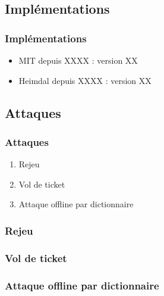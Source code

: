\documentclass[svgnames]{beamer}
\begin{document}
\subsection{Implémentations}

\begin{frame}
  \frametitle{Implémentations}
  
  \begin{itemize}
   \item MIT depuis XXXX : version XX %
   \item Heimdal depuis XXXX : version XX %
  \end{itemize}
  
  
\end{frame}


\subsection{Attaques}

\begin{frame}
 \frametitle{Attaques}
 
 \begin{enumerate}
  \item Rejeu
  \item Vol de ticket
  \item Attaque offline par dictionnaire
 \end{enumerate}

\end{frame}

\begin{frame}
 \frametitle{Rejeu}
 
\end{frame}

\begin{frame}
 \frametitle{Vol de ticket}
 
\end{frame}


\begin{frame}
 \frametitle{Attaque offline par dictionnaire}
 
 
\end{frame}
\end{document}

